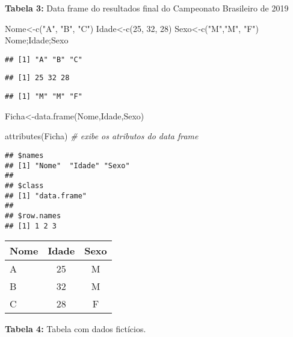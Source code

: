 \documentclass[
]{book}
\newenvironment{Shaded}{\begin{snugshade}}{\end{snugshade}}
\newcommand{\CommentTok}[1]{\textcolor[rgb]{0.56,0.35,0.01}{\textit{#1}}}
\newcommand{\DecValTok}[1]{\textcolor[rgb]{0.00,0.00,0.81}{#1}}
\newcommand{\FunctionTok}[1]{\textcolor[rgb]{0.00,0.00,0.00}{#1}}
\newcommand{\NormalTok}[1]{#1}
\newcommand{\OtherTok}[1]{\textcolor[rgb]{0.56,0.35,0.01}{#1}}
\newcommand{\StringTok}[1]{\textcolor[rgb]{0.31,0.60,0.02}{#1}}
\begin{document}
\textbf{Tabela 3:} Data frame do resultados final do Campeonato Brasileiro de 2019

\begin{Shaded}
\begin{Highlighting}[]
\NormalTok{Nome}\OtherTok{\textless{}{-}}\FunctionTok{c}\NormalTok{(}\StringTok{"A"}\NormalTok{, }\StringTok{"B"}\NormalTok{, }\StringTok{"C"}\NormalTok{)}
\NormalTok{Idade}\OtherTok{\textless{}{-}}\FunctionTok{c}\NormalTok{(}\DecValTok{25}\NormalTok{, }\DecValTok{32}\NormalTok{, }\DecValTok{28}\NormalTok{)}
\NormalTok{Sexo}\OtherTok{\textless{}{-}}\FunctionTok{c}\NormalTok{(}\StringTok{"M"}\NormalTok{,}\StringTok{"M"}\NormalTok{, }\StringTok{"F"}\NormalTok{)}
\NormalTok{Nome;Idade;Sexo}
\end{Highlighting}
\end{Shaded}

\begin{verbatim}
## [1] "A" "B" "C"
\end{verbatim}

\begin{verbatim}
## [1] 25 32 28
\end{verbatim}

\begin{verbatim}
## [1] "M" "M" "F"
\end{verbatim}

\begin{Shaded}
\begin{Highlighting}[]
\NormalTok{Ficha}\OtherTok{\textless{}{-}}\FunctionTok{data.frame}\NormalTok{(Nome,Idade,Sexo)}

\FunctionTok{attributes}\NormalTok{(Ficha) }\CommentTok{\# exibe os atributos do data frame}
\end{Highlighting}
\end{Shaded}

\begin{verbatim}
## $names
## [1] "Nome"  "Idade" "Sexo" 
## 
## $class
## [1] "data.frame"
## 
## $row.names
## [1] 1 2 3
\end{verbatim}

\begin{tabular}{l|c|c}
\hline
Nome & Idade & Sexo\\
\hline
A & 25 & M\\
\hline
B & 32 & M\\
\hline
C & 28 & F\\
\hline
\end{tabular}

\textbf{Tabela 4:} Tabela com dados fictícios.
\end{document}
